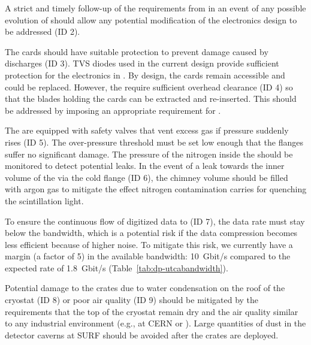 A strict and timely follow-up of the  requirements from in an event of any possible evolution of \dual {} should allow any potential modification of the   electronics design to be addressed (ID 2).

The  cards should have suitable protection to prevent damage caused by  discharges (ID 3). TVS diodes used in the current design provide sufficient protection for the  electronics in . By design, the  cards remain accessible and could be replaced. However, the  require sufficient overhead clearance (ID 4) so that the blades holding the  cards can be extracted and re-inserted. This should be addressed by imposing an appropriate requirement for .

The  are equipped with safety valves that vent excess gas if pressure suddenly rises (ID 5). The over-pressure threshold must be set low enough that the flanges suffer no significant damage. The pressure of the nitrogen inside the  should be monitored to detect potential leaks. In the event of a leak towards the inner volume of the  via the cold flange (ID 6), the chimney volume should be filled with argon gas to mitigate the effect nitrogen contamination carries for quenching the scintillation light.  

To ensure the continuous flow of digitized data to  (ID 7), the data rate must stay below the  bandwidth, which is a potential risk if the data compression becomes less efficient because of higher noise. To mitigate this risk, we currently have a margin (a factor of \num{5}) in the available bandwidth: \SI{10}{Gbit/s}  compared to the expected rate of \SI{1.8}{Gbit/s} (Table~\ref{tab:dp-utcabandwidth}).

Potential damage to the  crates due to water condensation on the roof of the cryostat (ID 8) or poor air quality (ID 9) should be mitigated by the  requirements that the top of the cryostat remain dry and the air quality similar to any industrial environment (e.g., at CERN or ). Large quantities of dust in the detector caverns at SURF should be avoided after the  crates are deployed.
